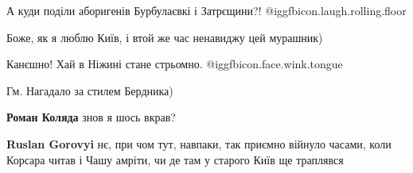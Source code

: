 \begin{itemize}
А куди поділи аборигенів Бурбулаєвкі і Затрєщини?!  @igg{fbicon.laugh.rolling.floor} 

 
Боже, як я люблю Київ, і втой же час ненавиджу цей мурашник)

 
Канєшно! Хай в Ніжині стане стрьомно.  @igg{fbicon.face.wink.tongue} 

 
Гм. Нагадало за стилем Бердника)

\begin{itemize}
 
\textbf{Роман Коляда} знов я шось вкрав?

 
\textbf{Ruslan Gorovyi} нє, при чом тут, навпаки, так приємно війнуло часами, коли Корсара читав і Чашу амріти, чи де там у старого Київ ще траплявся
\end{itemize}

 

\end{itemize}

